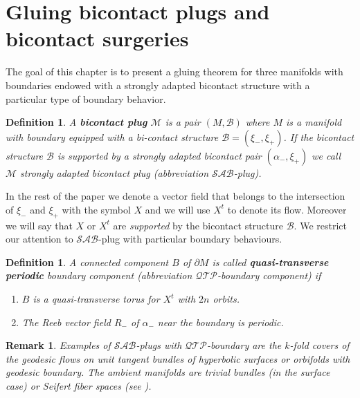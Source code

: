 \documentclass{amsart}
\renewcommand{\emph}{\textbf}
\newtheorem{definition}[theorem]{Definition}
\newtheorem{remark}[theorem]{Remark}
\theoremstyle{definition}
\theoremstyle{remark}
\begin{document}
\section{Gluing bicontact plugs and bicontact surgeries}

The goal of this chapter is to present a gluing theorem for three manifolds with boundaries endowed with a strongly adapted  bicontact structure with a particular type of boundary behavior.

\begin{definition}
A \textbf{bicontact plug} $\mathcal{M}$ is a pair $(M,\mathcal{B})$ where $M$ is a manifold with boundary equipped with a bi-contact structure $\mathcal{B}=(\xi_-,\xi_+)$. If the bicontact structure $\mathcal{B}$ is supported by a strongly adapted bicontact pair $(\alpha_-,\xi_+)$ we call $\mathcal{M}$ strongly adapted bicontact plug (abbreviation $\mathcal{SAB}$-plug).
\end{definition}

In the rest of the paper we denote a vector field that belongs to the intersection of $\xi_-$ and $\xi_+$ with the symbol $X$ and we will use $X^t$ to denote its flow. Moreover we will say that $X$ or $X^t$ are {\it supported} by the bicontact structure $\mathcal{B}$. We restrict our attention to $\mathcal{SAB}$-plug with particular boundary behaviours. 



\begin{definition}A connected component $B$ of $\partial M$ is called {\emph{quasi-transverse periodic}} boundary component (abbreviation $\mathcal{QTP}$-boundary component) if

 \begin{enumerate}
  \item $B$ is a quasi-transverse torus for $X^t$ with $2n$ orbits.
  \item 
  The Reeb vector field $R_-$ of $\alpha_-$ near the boundary is periodic.
\end{enumerate}
\end{definition}



\begin{remark}
  Examples of $\mathcal{SAB}$-plugs with $\mathcal{QTP}$-boundary are the $k$-fold covers of the geodesic flows on unit tangent bundles of hyperbolic surfaces or orbifolds with geodesic boundary. The ambient manifolds are trivial bundles (in the surface case) or Seifert fiber spaces (see \cite{MontesinosBook87,ClayPinsky2025Graph}).
\end{remark}
\end{document}
